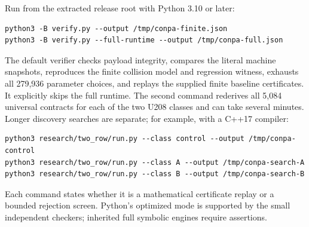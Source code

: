 Run from the extracted release root with Python 3.10 or later:
\begin{lstlisting}
python3 -B verify.py --output /tmp/conpa-finite.json
python3 -B verify.py --full-runtime --output /tmp/conpa-full.json
\end{lstlisting}
The default verifier checks payload integrity, compares the literal
machine snapshots, reproduces the finite collision model and regression
witness, exhausts all 279,936 parameter choices, and replays the supplied
finite baseline certificates. It explicitly skips the full runtime. The
second command rederives all 5,084 universal contracts for each of the two
U208 classes and can take several minutes. Longer discovery searches are
separate; for example, with a C++17 compiler:
\begin{lstlisting}
python3 research/two_row/run.py --class control --output /tmp/conpa-control
python3 research/two_row/run.py --class A --output /tmp/conpa-search-A
python3 research/two_row/run.py --class B --output /tmp/conpa-search-B
\end{lstlisting}
Each command states whether it is a mathematical certificate replay or a
bounded rejection screen. Python's optimized mode is supported by the small
independent checkers; inherited full symbolic engines require assertions.
